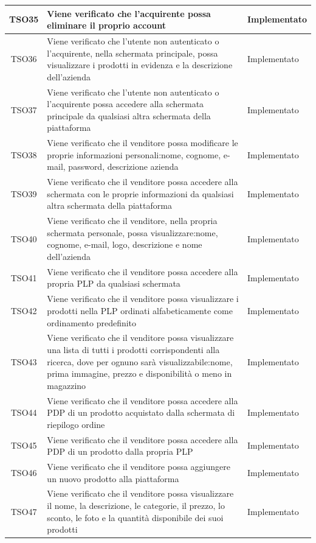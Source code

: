 \begin{longtable}{|c| C{10cm} |C{3cm}|}
	TSO35 & Viene verificato che l'acquirente possa eliminare il proprio account & Implementato\\ \hline
	TSO36 & Viene verificato che l'utente non autenticato o l'acquirente, nella schermata principale, possa visualizzare i prodotti in evidenza e la descrizione dell'azienda & Implementato\\ \hline
	TSO37 & Viene verificato che l'utente non autenticato o l'acquirente possa accedere alla schermata principale da qualsiasi altra schermata della piattaforma & Implementato\\ \hline
    TSO38 & Viene verificato che il venditore possa modificare le proprie informazioni personali:nome, cognome, e-mail, password, descrizione azienda & Implementato\\ \hline
	TSO39 & Viene verificato che il venditore possa accedere alla schermata con le proprie informazioni da qualsiasi altra schermata della piattaforma & Implementato\\ \hline
    TSO40 & Viene verificato che il venditore, nella propria schermata personale, possa visualizzare:nome, cognome, e-mail, logo, descrizione e nome dell'azienda & Implementato\\ \hline
	TSO41 & Viene verificato che il venditore possa accedere alla propria PLP da qualsiasi schermata & Implementato\\ \hline
	TSO42 & Viene verificato che il venditore possa visualizzare i prodotti nella PLP ordinati alfabeticamente come ordinamento predefinito & Implementato\\ \hline
	TSO43 & Viene verificato che il venditore possa visualizzare una lista di tutti i prodotti corrispondenti alla ricerca, dove per ognuno sarà visualizzabile:nome, prima immagine, prezzo e disponibilità o meno in magazzino & Implementato\\ \hline
	TSO44 & Viene verificato che il venditore possa accedere alla PDP di un prodotto acquistato dalla schermata di riepilogo ordine & Implementato\\ \hline
	TSO45 & Viene verificato che il venditore possa accedere alla PDP di un prodotto dalla propria PLP & Implementato\\ \hline
    	TSO46 & Viene verificato che il venditore possa aggiungere un nuovo prodotto alla piattaforma & Implementato\\ \hline
    	TSO47 & Viene verificato che il venditore possa visualizzare il nome, la descrizione, le categorie, il prezzo, lo sconto, le foto e la quantità disponibile dei suoi prodotti & Implementato\\ \hline

\end{longtable}
